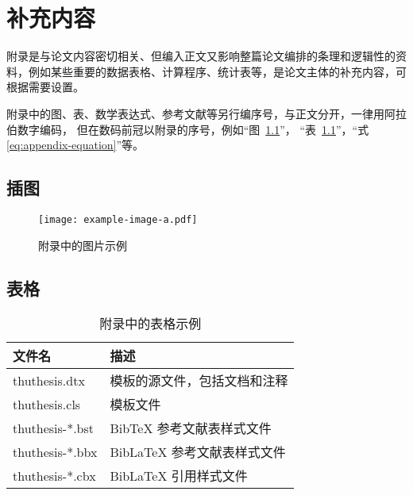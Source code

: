 
\chapter{补充内容}

附录是与论文内容密切相关、但编入正文又影响整篇论文编排的条理和逻辑性的资料，例如某些重要的数据表格、计算程序、统计表等，是论文主体的补充内容，可根据需要设置。

附录中的图、表、数学表达式、参考文献等另行编序号，与正文分开，一律用阿拉伯数字编码，
但在数码前冠以附录的序号，例如“图~\ref{fig:appendix-figure}”，
“表~\ref{tab:appendix-table}”，“式\eqref{eq:appendix-equation}”等。


\section{插图}


\begin{figure}
  \centering
  \texttt{[image: example-image-a.pdf]}
  \caption{附录中的图片示例}
  \label{fig:appendix-figure}
\end{figure}


\section{表格}


\begin{table}
  \centering
  \caption{附录中的表格示例}
  \begin{tabular}{ll}
    \toprule
    文件名          & 描述                         \\
    \midrule
    thuthesis.dtx   & 模板的源文件，包括文档和注释 \\
    thuthesis.cls   & 模板文件                     \\
    thuthesis-*.bst & BibTeX 参考文献表样式文件    \\
    thuthesis-*.bbx & BibLaTeX 参考文献表样式文件  \\
    thuthesis-*.cbx & BibLaTeX 引用样式文件        \\
    \bottomrule
  \end{tabular}
  \label{tab:appendix-table}
\end{table}


